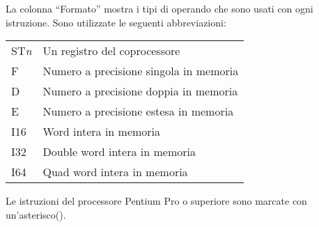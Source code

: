 La colonna ``Formato'' mostra i tipi di operando che sono usati con 
ogni istruzione. Sono utilizzate le seguenti abbreviazioni:
\begin{center}
\begin{tabular}{|l|l|}
\hline
ST\emph{n} & Un registro del coprocessore \\
F          & Numero a precisione singola in memoria \\
D          & Numero a precisione doppia in memoria \\
E          & Numero a precisione estesa in memoria \\
I16        & Word intera in memoria \\
I32        & Double word intera in memoria \\
I64        & Quad word intera in memoria \\
\hline
\end{tabular}
\end{center}

Le istruzioni del processore Pentium Pro o superiore sono marcate
con un'asterisco(\footnotemark[1]).


